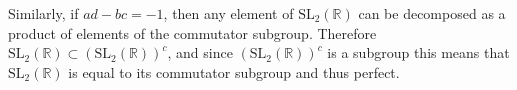 \documentclass{article}
\begin{document}
\begin{Answer}
\begin{enumerate}[(a)]
{      %
      Similarly, if $ad - bc = -1$, then any element of 
      $\mathrm{SL}_2(\mathbb{R})$ can be decomposed as a product of
      elements of the commutator subgroup. Therefore 
      $\mathrm{SL}_2(\mathbb{R}) \subset (\mathrm{SL}_2(\mathbb{R}))^c$,
      and since $(\mathrm{SL}_2(\mathbb{R}))^c$ is a subgroup this
      means that $\mathrm{SL}_2(\mathbb{R})$ is equal to its
      commutator subgroup and thus perfect.
      }
\end{enumerate}

\end{Answer}
\end{document}

